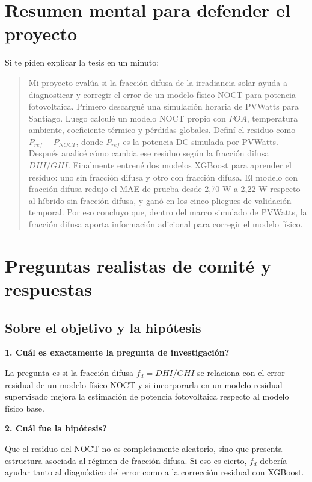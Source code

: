 \documentclass[11pt, letterpaper]{article}
\newcommand{\fd}{f_d}
\begin{document}
\section{Resumen mental para defender el proyecto}

Si te piden explicar la tesis en un minuto:

\begin{quote}
Mi proyecto eval\'ua si la fracci\'on difusa de la irradiancia solar ayuda a diagnosticar y corregir el error de un modelo f\'isico NOCT para potencia fotovoltaica. Primero descargu\'e una simulaci\'on horaria de PVWatts para Santiago. Luego calcul\'e un modelo NOCT propio con \(POA\), temperatura ambiente, coeficiente t\'ermico y p\'erdidas globales. Defin\'i el residuo como \(P_{ref}-P_{NOCT}\), donde \(P_{ref}\) es la potencia DC simulada por PVWatts. Despu\'es analic\'e c\'omo cambia ese residuo seg\'un la fracci\'on difusa \(DHI/GHI\). Finalmente entren\'e dos modelos XGBoost para aprender el residuo: uno sin fracci\'on difusa y otro con fracci\'on difusa. El modelo con fracci\'on difusa redujo el MAE de prueba desde 2,70 W a 2,22 W respecto al h\'ibrido sin fracci\'on difusa, y gan\'o en los cinco pliegues de validaci\'on temporal. Por eso concluyo que, dentro del marco simulado de PVWatts, la fracci\'on difusa aporta informaci\'on adicional para corregir el modelo f\'isico.
\end{quote}

\section{Preguntas realistas de comit\'e y respuestas}

\subsection{Sobre el objetivo y la hip\'otesis}

\textbf{1. \textquestiondown Cu\'al es exactamente la pregunta de investigaci\'on?}

La pregunta es si la fracci\'on difusa \(\fd=DHI/GHI\) se relaciona con el error residual de un modelo f\'isico NOCT y si incorporarla en un modelo residual supervisado mejora la estimaci\'on de potencia fotovoltaica respecto al modelo f\'isico base.

\textbf{2. \textquestiondown Cu\'al fue la hip\'otesis?}

Que el residuo del NOCT no es completamente aleatorio, sino que presenta estructura asociada al r\'egimen de fracci\'on difusa. Si eso es cierto, \(\fd\) deber\'ia ayudar tanto al diagn\'ostico del error como a la correcci\'on residual con XGBoost.
\end{document}
